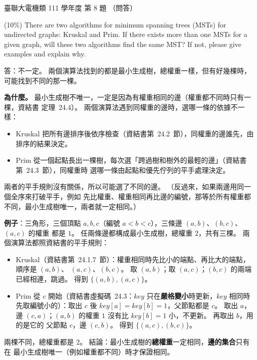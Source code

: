 \begin{pastexam}[label={px:ust-111-ee-ds-08}]{臺聯大電機類 111 學年度 第 8 題}
（問答）

(10\%) There are two algorithms for minimum spanning trees (MSTs) for undirected graphs: Kruskal and
Prim. If there exists more than one MSTs for a given graph, will these two algorithms find the same
MST? If not, please give examples and explain why.
\end{pastexam}

\begin{pastsoln}
答：不一定。 兩個演算法找到的都是最小生成樹，總權重一樣，但有好幾棵時，可能找到不同的那一棵。

\textbf{為什麼。} 最小生成樹不唯一，一定是因為有權重相同的邊（權重都不同時只有一棵，資結書
定理~24.4）。 兩個演算法遇到同權重的邊時，選哪一條的依據不一樣：
\begin{itemize}
\item Kruskal 把所有邊排序後依序檢查（資結書第~24.2~節），同權重的邊誰先，由排序的結果決定。
\item Prim 從一個起點長出一棵樹，每次選「跨過樹和樹外的最輕的邊」（資結書第~24.3~節），同權重時
選哪一條由起點和優先佇列的平手處理決定。
\end{itemize}
兩者的平手規則沒有關係，所以可能選了不同的邊。 （反過來，如果兩邊用同一個全序來打破平手，例如
先比權重、權重相同再比邊的編號，那等於所有權重都不同，最小生成樹唯一，兩者就一定相同。）

\textbf{例子}：三角形，三個頂點 $a, b, c$（編號 $a < b < c$），三條邊 $(a, b)$、$(b, c)$、$(a, c)$ 的權重
都是 $1$。 任兩條邊都構成最小生成樹，總權重 $2$，共有三棵。 兩個演算法都照資結書的平手規則：
\begin{itemize}
\item Kruskal（資結書第~24.1.7~節）：權重相同時先比小的端點、再比大的端點，順序是 $(a, b)$、
$(a, c)$、$(b, c)$。 取 $(a, b)$；取 $(a, c)$；$(b, c)$ 的兩端已經相連，跳過。 得到
$\{(a, b), (a, c)\}$。
\item Prim 從 $c$ 開始（資結書虛擬碼~24.3：$\mathit{key}$ 只在\textbf{嚴格變小}時更新，$\mathit{key}$
相同時先取編號小的）：取出 $c$ 後 $\mathit{key}[a] = \mathit{key}[b] = 1$，父節點都是 $c$。 取出 $a$，
邊 $(c, a)$；$(a, b)$ 的權重 $1$ 沒有比 $\mathit{key}[b] = 1$ 小，不更新。 再取出 $b$，用的是它的
父節點 $c$，邊 $(c, b)$。 得到 $\{(a, c), (b, c)\}$。
\end{itemize}
兩棵不同，總權重都是 $2$。 結論：最小生成樹的\textbf{總權重}一定相同，\textbf{邊的集合}只有在
最小生成樹唯一（例如權重都不同）時才保證相同。
\end{pastsoln}
